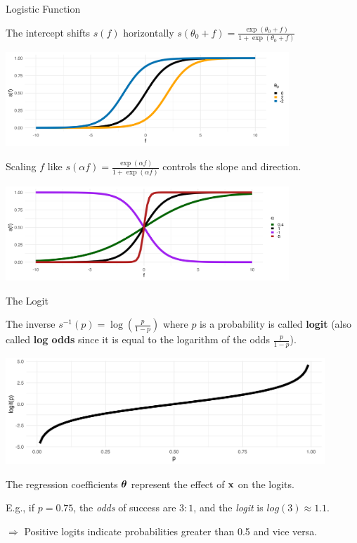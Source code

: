 \documentclass[11pt,compress,t,notes=noshow, xcolor=table]{beamer}
\begin{document}
\begin{vbframe}{Logistic Function}
  
The intercept shifts $s(f)$ horizontally $s(\theta_0 + f) = \frac{\exp(\theta_0 + f)}{1+\exp(\theta_0 + f)}$

{
\centering \includegraphics[width=0.8\textwidth]{figure/logistic_shifted.png}
}

Scaling $f$ like $s(\alpha f) = \frac{\exp(\alpha f)}{1+\exp(\alpha f)}$ controls the slope and direction.

{
\centering \includegraphics[width=0.8\textwidth]{figure/logistic_scaled.png}
}

\end{vbframe}

\begin{vbframe}{The Logit}

The inverse $s^{-1}(p) = \log\left(\frac{p}{1 - p}\right)$ where $p$ is a probability is called \textbf{logit} (also called \textbf{log odds} since it is equal to the logarithm of the odds $\frac{p}{1-p}$).

\begin{center}
\includegraphics[width=0.9\textwidth]{figure/logit_function.png}
\end{center}

The regression coefficients $\bm{\theta}$ represent the effect of $\mathbf{x}$ on the logits.

\lz

\small{E.g., if $p = 0.75$, the \textit{odds} of success are $3:1$, and the \textit{logit} is $log(3) \approx 1.1$.}

\vspace{1em}

$\Rightarrow$ Positive logits indicate probabilities greater than 0.5 and vice versa.
\end{vbframe}
\end{document}
